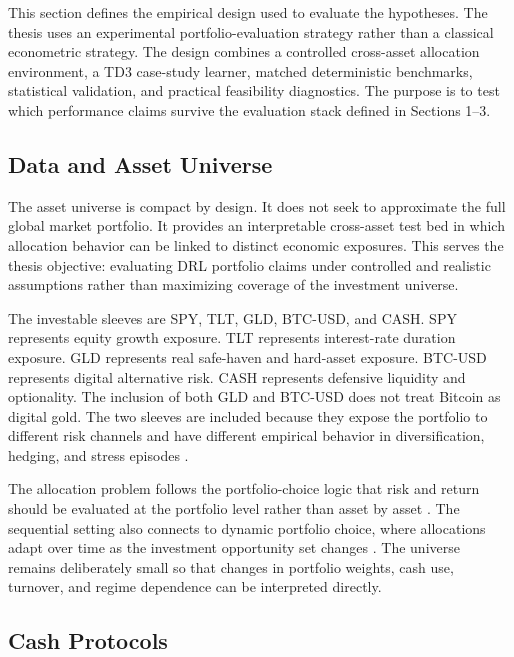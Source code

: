 \documentclass[12pt]{article}
\begin{document}
This section defines the empirical design used to evaluate the hypotheses. The thesis uses an experimental portfolio-evaluation strategy rather than a classical econometric strategy. The design combines a controlled cross-asset allocation environment, a TD3 case-study learner, matched deterministic benchmarks, statistical validation, and practical feasibility diagnostics. The purpose is to test which performance claims survive the evaluation stack defined in Sections 1--3.

\subsection{Data and Asset Universe}

The asset universe is compact by design. It does not seek to approximate the full global market portfolio. It provides an interpretable cross-asset test bed in which allocation behavior can be linked to distinct economic exposures. This serves the thesis objective: evaluating DRL portfolio claims under controlled and realistic assumptions rather than maximizing coverage of the investment universe.

The investable sleeves are SPY, TLT, GLD, BTC-USD, and CASH. SPY represents equity growth exposure. TLT represents interest-rate duration exposure. GLD represents real safe-haven and hard-asset exposure. BTC-USD represents digital alternative risk. CASH represents defensive liquidity and optionality. The inclusion of both GLD and BTC-USD does not treat Bitcoin as digital gold. The two sleeves are included because they expose the portfolio to different risk channels and have different empirical behavior in diversification, hedging, and stress episodes \citep{bouri2017bitcoinhedge,henriques2018bitcoinGold,guesmi2019bitcoinDiversification,klein2018bitcoin,platanakis2020bitcoin,hubrich2023bitcoin,petukhina2021digitalassets}.

The allocation problem follows the portfolio-choice logic that risk and return should be evaluated at the portfolio level rather than asset by asset \citep{markowitz1952,sharpe1966}. The sequential setting also connects to dynamic portfolio choice, where allocations adapt over time as the investment opportunity set changes \citep{merton1969,merton1971}. The universe remains deliberately small so that changes in portfolio weights, cash use, turnover, and regime dependence can be interpreted directly.

\subsection{Cash Protocols}
\end{document}
